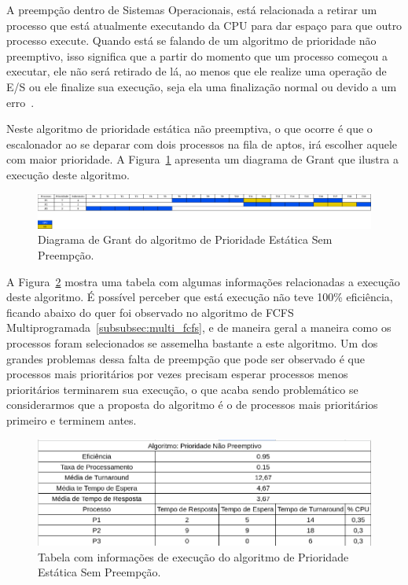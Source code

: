\documentclass[
	12pt,				%
	oneside,   	        %
	a4paper,			%
	english,			%
	french,				%
	spanish,			%
	brazil,				%
	]{pacotes/abntex2}
\begin{document}
A preempção dentro de Sistemas Operacionais, está relacionada a retirar um processo que está atualmente executando da CPU para dar espaço para que outro processo execute. Quando está se falando de um algoritmo de prioridade não preemptivo, isso significa que a partir do momento que um processo começou a executar, ele não será retirado de lá, ao menos que ele realize uma operação de E/S ou ele finalize sua execução, seja ela uma finalização normal ou devido a um erro~\cite{maziero2019}.

Neste algoritmo de prioridade estática não preemptiva, o que ocorre é que o escalonador ao se deparar com dois processos na fila de aptos, irá escolher aquele com maior prioridade. A Figura~\ref{fig:prio_sem_preemp} apresenta um diagrama de Grant que ilustra a execução deste algoritmo.

\begin{figure}[H]
  \centering
  \includegraphics[scale=0.20]{figuras/ex2/prio_sem_preemp.png}
  \caption{Diagrama de Grant do algoritmo de Prioridade Estática Sem Preempção.}
  \label{fig:prio_sem_preemp}
\end{figure}

A Figura~\ref{fig:table_prio_sem_preemp} mostra uma tabela com algumas informações relacionadas a execução deste algoritmo. É possível perceber que está execução não teve 100\% eficiência, ficando abaixo do quer foi observado no algoritmo de FCFS Multiprogramada~\ref{subsubsec:multi_fcfs}, e de maneira geral a maneira como os processos foram selecionados se assemelha bastante a este algoritmo. Um dos grandes problemas dessa falta de preempção que pode ser observado é que processos mais prioritários por vezes precisam esperar processos menos prioritários terminarem sua execução, o que acaba sendo problemático se considerarmos que a proposta do algoritmo é o de processos mais prioritários primeiro e terminem antes.

\begin{figure}[H]
  \centering
  \includegraphics[scale=0.5]{figuras/ex2/table_prio_sem_preemp.png}
  \caption{Tabela com informações de execução do algoritmo de Prioridade Estática Sem Preempção.}
  \label{fig:table_prio_sem_preemp}
\end{figure}
\end{document}
